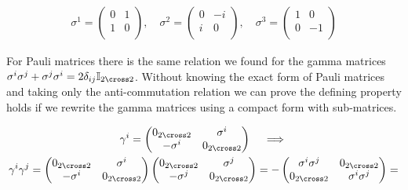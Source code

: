 \begin{equation*}
    \begin{gathered}
        \sigma^{1} = 
         \begin{pmatrix}
          0 & 1 \\
          1 & 0 \\
         \end{pmatrix}, \quad
        \sigma^{2} = 
         \begin{pmatrix}
          0 & -i \\
          i & 0 \\
         \end{pmatrix}, \quad
        \sigma^{3} = 
         \begin{pmatrix}
          1 & 0 \\
          0 & -1 \\
         \end{pmatrix}
    \end{gathered}
\end{equation*}

For Pauli matrices there is the same relation we found for the gamma matrices $\sigma^{i} \sigma^{j} + \sigma^{j} \sigma^{i} = 2 
\delta_{ij} \mathbb{I}_{2 \cross 2}$. Without knowing the exact form of Pauli matrices and taking only the anti-commutation relation
we can prove the defining property holds if we rewrite the gamma matrices using a compact form with sub-matrices.

\begin{equation*}
    \begin{gathered}
        \gamma^{i} = 
        \begin{pmatrix}
             0_{2 \cross 2} & \sigma^{i} \\
              - \sigma^{i} & 0_{2 \cross 2} \\
        \end{pmatrix} \quad \implies \\
        \gamma^{i} \gamma^{j} =
        \begin{pmatrix}
             0_{2 \cross 2} & \sigma^{i} \\
              - \sigma^{i} & 0_{2 \cross 2} \\
        \end{pmatrix}
        \begin{pmatrix}
             0_{2 \cross 2} & \sigma^{j} \\
              - \sigma^{j} & 0_{2 \cross 2} \\
        \end{pmatrix} =
        - \begin{pmatrix}
             \sigma^{i} \sigma^{j} & 0_{2 \cross 2} \\
             0_{2 \cross 2} & \sigma^{i} \sigma^{j}
        \end{pmatrix} = 
    \end{gathered}
\end{equation*}

